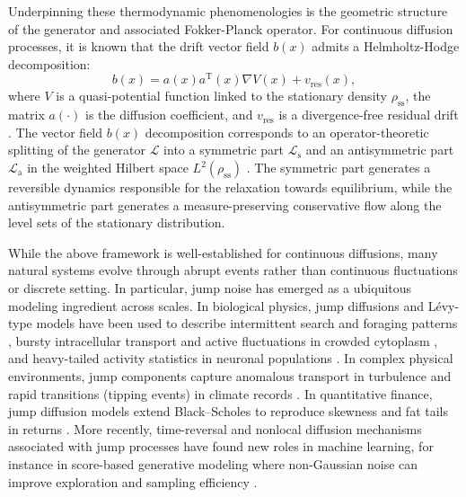 \documentclass[10pt]{article}
\theoremstyle{definition}
\numberwithin{equation}{section}
\begin{document}
Underpinning these thermodynamic phenomenologies is the geometric structure of the generator and associated Fokker-Planck operator.
For continuous diffusion processes, it is known that the drift vector field $b(x)$ admits a Helmholtz-Hodge decomposition: 
$$b(x) = a(x)a^\mathrm{T}(x)\nabla V(x) + v_\mathrm{res}(x),$$
where $V$ is a quasi-potential function linked to the stationary density $\rho_\mathrm{ss}$, the matrix $a(\cdot)$ is the diffusion coefficient, and $v_\mathrm{res}$ is a divergence-free residual drift \cite{A04,Q13, DP23}.
The vector field $b(x)$ decomposition corresponds to an operator-theoretic splitting of the generator $\mathcal{L}$ into a symmetric part $\mathcal{L}_\mathrm{s}$ and an antisymmetric part $\mathcal{L}_\mathrm{a}$ in the weighted Hilbert space $L^2(\rho_\mathrm{ss})$ \cite{Q13,DP23}. 
The symmetric part generates a reversible dynamics responsible for the relaxation towards equilibrium, while the antisymmetric part generates a measure-preserving conservative flow along the level sets of the stationary distribution. 

While the above framework is well-established for continuous diffusions, many natural systems evolve through abrupt events rather than continuous fluctuations or discrete setting. 
In particular, jump noise has emerged as a ubiquitous modeling ingredient across scales. 
In biological physics, jump diffusions and L\'evy-type models have been used to describe intermittent search and foraging patterns \cite{Viswanathan99,Bartumeus05}, bursty intracellular transport and active fluctuations in crowded cytoplasm \cite{LVS2015}, and heavy-tailed activity statistics in neuronal populations \cite{Beggs03}. 
In complex physical environments, jump components capture anomalous transport in turbulence \cite{Shlesinger87} and rapid transitions (tipping events) in climate records \cite{Ditlevsen10}. 
In quantitative finance, jump diffusion models extend Black--Scholes to reproduce skewness and fat tails in returns \cite{Merton76,DK08}. 
More recently, time-reversal and nonlocal diffusion mechanisms associated with jump processes have found new roles in machine learning, for instance in score-based generative modeling where non-Gaussian noise can improve exploration and sampling efficiency \cite{YP23,GeneratorMatching}. 
 
\end{document}
